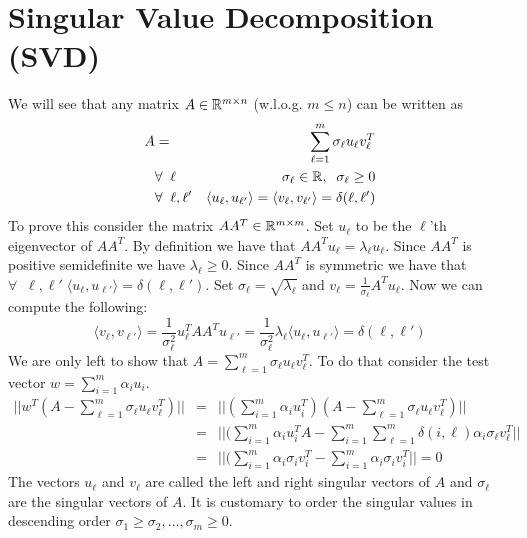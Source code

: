 \documentclass{article}
\begin{document}



\section{Singular Value Decomposition (SVD)}


\noindent We will see that any matrix $A \in {\mathbb{R}}^{m \times n}$ (w.l.o.g. $m \le n$) can be written as 
\begin{eqnarray}
A &=& \sum_{\ell=1}^{m} \sigma_{\ell} u_{\ell} v_{\ell}^{T}\\
&\forall \;\; \ell& \sigma_\ell \in {\mathbb{R}},  \;\; \sigma_\ell \ge 0\\
&\forall \;\; \ell, \ell'&  \langle u_{\ell}, u_{\ell'} \rangle=  \langle v_{\ell}, v_{\ell'} \rangle = \delta(\ell,\ell')
\end{eqnarray}
%
To prove this consider the matrix $AA^{T} \in {\mathbb{R}}^{m\times m}$.
Set $u_\ell$ to be the $\ell$'th eigenvector of $AA^{T}$.
By definition we have that $AA^{T}u_\ell = \lambda_\ell u_\ell$.
Since $AA^{T}$ is positive semidefinite we have $\lambda_\ell \ge 0$.
Since $AA^{T}$ is symmetric we have that $\forall \;\; \ell, \ell' \;  \langle u_{\ell}, u_{\ell'} \rangle = \delta(\ell,\ell')$.
Set $\sigma_\ell = \sqrt{\lambda_\ell}$ and $v_\ell = \frac{1}{\sigma_\ell}A^{T}u_{\ell}$.
Now we can compute the following:
\[
\langle v_{\ell}, v_{\ell'} \rangle =  \frac{1}{\sigma^{2}_\ell}u_{\ell}^{T}AA^{T}u_{\ell'} =   \frac{1}{\sigma_{\ell}^{2}}\lambda_\ell  \langle u_{\ell}, u_{\ell'} \rangle = \delta(\ell,\ell')
\]
%
We are only left to show that $A = \sum_{\ell=1}^{m} \sigma_{\ell} u_{\ell} v_{\ell}^{T}$.
To do that consider the test vector $w = \sum_{i=1}^{m} \alpha_i u_i$.
\begin{eqnarray*}
|| w^{T}(A - \sum_{\ell=1}^{m} \sigma_{\ell} u_{\ell} v_{\ell}^{T})|| &=& || (\sum_{i=1}^{m}\alpha_i u^{T}_{i})(A - \sum_{\ell=1}^{m} \sigma_{\ell} u_{\ell} v_{\ell}^{T})|| \\
&=& || (\sum_{i=1}^{m}\alpha_{i} u^{T}_{i}A - \sum_{i=1}^{m}\sum_{\ell=1}^{m} \delta(i,\ell) \alpha_i \sigma_{\ell} v_{\ell}^{T}|| \\
&=& || (\sum_{i=1}^{m}\alpha_{i} \sigma_{i} v^{T}_{i} - \sum_{i=1}^{m} \alpha_i \sigma_{i} v_{i}^{T}|| = 0
\end{eqnarray*}
%
The vectors $u_\ell$ and $v_{\ell}$ are called the left and right singular vectors of $A$ and $\sigma_\ell$ are the singular vectors of $A$.
It is customary to order the singular values in descending order $\sigma_1 \ge \sigma_2, \ldots , \sigma_m \ge 0$.
\end{document}
